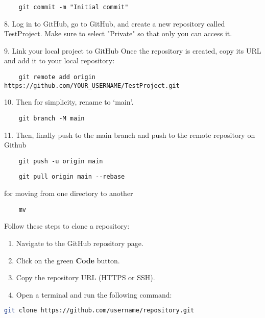 \begin{lstlisting}
    git commit -m "Initial commit"
\end{lstlisting}

8. Log in to GitHub, go to GitHub, and create a new repository called TestProject. Make sure to select "Private" so that only you can access it.

9. Link your local project to GitHub
Once the repository is created, copy its URL and add it to your local repository:

\begin{lstlisting}
    git remote add origin https://github.com/YOUR_USERNAME/TestProject.git
\end{lstlisting}

10. Then for simplicity, rename to `main'.

\begin{lstlisting}
    git branch -M main
\end{lstlisting}

11. Then, finally push to the main branch and push to the remote repository on Github

\begin{lstlisting}
    git push -u origin main
\end{lstlisting}

\begin{lstlisting}
    git pull origin main --rebase
\end{lstlisting}

for moving from one directory to another

\begin{lstlisting}
    mv
\end{lstlisting}

Follow these steps to clone a repository:

\begin{enumerate}
    \item Navigate to the GitHub repository page.
    \item Click on the green \textbf{Code} button.
    \item Copy the repository URL (HTTPS or SSH).
    \item Open a terminal and run the following command:
\end{enumerate}

\begin{lstlisting}[language=bash]
git clone https://github.com/username/repository.git
\end{lstlisting}

